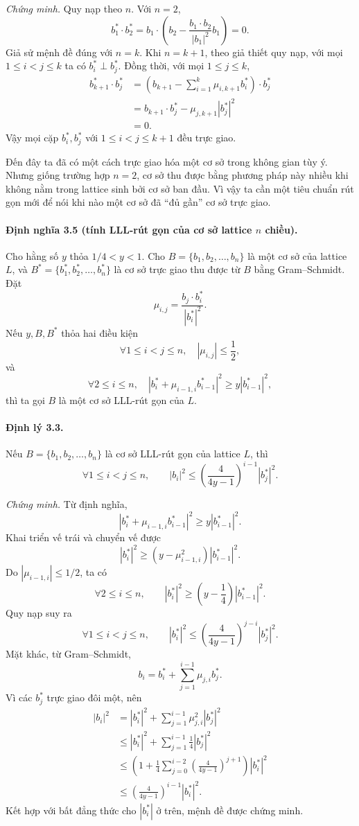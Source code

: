 \documentclass[11pt]{article}
\begin{document}
\emph{Chứng minh.}
Quy nạp theo \(n\). Với \(n=2\),
\[
  b_1^*\cdot b_2^*
  =b_1\cdot\left(b_2-\frac{b_1\cdot b_2}{|b_1|^2}b_1\right)
  =0.
\]
Giả sử mệnh đề đúng với \(n=k\). Khi \(n=k+1\), theo giả thiết quy nạp, với
mọi \(1\le i<j\le k\) ta có \(b_i^*\perp b_j^*\). Đồng thời, với mọi
\(1\le j\le k\),
\[
\begin{aligned}
 b_{k+1}^*\cdot b_j^*
 &=\left(b_{k+1}-\sum_{i=1}^{k}\mu_{i,k+1}b_i^*\right)\cdot b_j^*\\
 &=b_{k+1}\cdot b_j^*-\mu_{j,k+1}|b_j^*|^2\\
 &=0.
\end{aligned}
\]
Vậy mọi cặp \(b_i^*,b_j^*\) với \(1\le i<j\le k+1\) đều trực giao.

Đến đây ta đã có một cách trực giao hóa một cơ sở trong không gian tùy ý.
Nhưng giống trường hợp \(n=2\), cơ sở thu được bằng phương pháp này nhiều khi
không nằm trong lattice sinh bởi cơ sở ban đầu. Vì vậy ta cần một tiêu chuẩn
rút gọn mới để nói khi nào một cơ sở đã ``đủ gần'' cơ sở trực giao.

\paragraph{Định nghĩa 3.5 (tính LLL-rút gọn của cơ sở lattice \(n\) chiều).}
Cho hằng số \(y\) thỏa \(1/4<y<1\). Cho \(B=\{b_1,b_2,\ldots,b_n\}\) là một
cơ sở của lattice \(L\), và \(B^*=\{b_1^*,b_2^*,\ldots,b_n^*\}\) là cơ sở trực
giao thu được từ \(B\) bằng Gram--Schmidt. Đặt
\[
  \mu_{i,j}=\frac{b_j\cdot b_i^*}{|b_i^*|^2}.
\]
Nếu \(y,B,B^*\) thỏa hai điều kiện
\[
  \forall 1\le i<j\le n,\quad |\mu_{i,j}|\le\frac12,
\]
và
\[
  \forall 2\le i\le n,\quad |b_i^*+\mu_{i-1,i}b_{i-1}^*|^2\ge y|b_{i-1}^*|^2,
\]
thì ta gọi \(B\) là một cơ sở LLL-rút gọn của \(L\).

\paragraph{Định lý 3.3.}
Nếu \(B=\{b_1,b_2,\ldots,b_n\}\) là cơ sở LLL-rút gọn của lattice \(L\), thì
\[
  \forall 1\le i<j\le n,\qquad
  |b_i|^2\le\left(\frac{4}{4y-1}\right)^{i-1}|b_j^*|^2.
\]

\emph{Chứng minh.}
Từ định nghĩa,
\[
  |b_i^*+\mu_{i-1,i}b_{i-1}^*|^2\ge y|b_{i-1}^*|^2.
\]
Khai triển vế trái và chuyển vế được
\[
  |b_i^*|^2\ge (y-\mu_{i-1,i}^2)|b_{i-1}^*|^2.
\]
Do \(|\mu_{i-1,i}|\le1/2\), ta có
\[
  \forall 2\le i\le n,\qquad
  |b_i^*|^2\ge\left(y-\frac14\right)|b_{i-1}^*|^2.
\]
Quy nạp suy ra
\[
  \forall 1\le i<j\le n,\qquad
  |b_i^*|^2\le\left(\frac{4}{4y-1}\right)^{j-i}|b_j^*|^2.
\]
Mặt khác, từ Gram--Schmidt,
\[
  b_i=b_i^*+\sum_{j=1}^{i-1}\mu_{j,i}b_j^*.
\]
Vì các \(b_j^*\) trực giao đôi một, nên
\[
\begin{aligned}
 |b_i|^2
 &=|b_i^*|^2+\sum_{j=1}^{i-1}\mu_{j,i}^2|b_j^*|^2\\
 &\le |b_i^*|^2+\sum_{j=1}^{i-1}\frac14|b_j^*|^2\\
 &\le \left(1+\frac14\sum_{j=0}^{i-2}
       \left(\frac{4}{4y-1}\right)^{j+1}\right)|b_i^*|^2\\
 &\le \left(\frac{4}{4y-1}\right)^{i-1}|b_i^*|^2.
\end{aligned}
\]
Kết hợp với bất đẳng thức cho \(|b_i^*|\) ở trên, mệnh đề được chứng minh.
\end{document}

